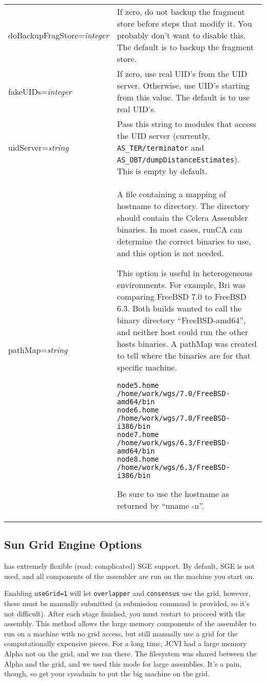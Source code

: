 \documentclass[twoside,11pt]{article}
\begin{document}
\begin{longtable}{lp{3.0in}}

doBackupFragStore={\it integer} &
If zero, do not backup the fragment store before steps that modify it.
You probably don't want to disable this.  The default is to backup the
fragment store.
\\

fakeUIDs={\it integer} &
If zero, use real UID's from the UID server.  Otherwise, use UID's
starting from this value.  The default is to use real UID's.
\\

uidServer={\it string} &
Pass this string to modules that access the UID server (currently,
{\tt AS\_TER/terminator} and {\tt AS\_OBT/dumpDistanceEstimates}).
This is empty by default.
\\

pathMap={\it string} &
A file containing a mapping of hostname to directory.  The directory
should contain the Celera Assembler binaries.  In most cases, runCA can
determine the correct binaries to use, and this option is not needed.

This option is useful in heterogeneous environments.  For example, Bri
was comparing FreeBSD 7.0 to FreeBSD 6.3.  Both builds wanted to call
the binary directory ``FreeBSD-amd64'', and neither host could run the
other hosts binaries.  A pathMap was created to tell where the
binaries are for that specific machine.

\begin{verbatim}
node5.home /home/work/wgs/7.0/FreeBSD-amd64/bin
node6.home /home/work/wgs/7.0/FreeBSD-i386/bin
node7.home /home/work/wgs/6.3/FreeBSD-amd64/bin
node8.home /home/work/wgs/6.3/FreeBSD-i386/bin
\end{verbatim}

Be sure to use the hostname as returned by ``uname -n''.
\\

\end{longtable}


\subsection{Sun Grid Engine Options}

\runCA has extremely flexible (read: complicated) SGE support.  By
default, SGE is not used, and all components of the assembler are run
on the machine you start \runCA on.

Enabling {\tt useGrid=1} will let {\tt overlapper} and {\tt consensus}
use the grid, however, these must be manually submitted (a submission
command is provided, so it's not difficult).  After each stage
finished, you must restart \runCA to proceed with the assembly.  This
method allows the large memory components of the assembler to run on a
machine with no grid access, but still manually use a grid for the
computationally expensive pieces.  For a long time, JCVI had a large
memory Alpha not on the grid, and we ran \runCA there.  The filesystem
was shared between the Alpha and the grid, and we used this mode for
large assemblies.  It's a pain, though, so get your sysadmin to put
the big machine on the grid.
\end{document}
